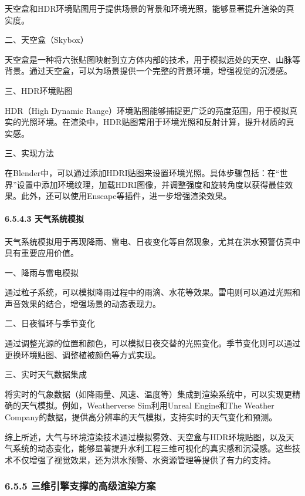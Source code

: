 天空盒和HDR环境贴图用于提供场景的背景和环境光照，能够显著提升渲染的真实度。

二、天空盒（Skybox）

天空盒是一种将六张贴图映射到立方体内部的技术，用于模拟远处的天空、山脉等背景。通过天空盒，可以为场景提供一个完整的背景环境，增强视觉的沉浸感。

三、HDR环境贴图

HDR（High Dynamic Range）环境贴图能够捕捉更广泛的亮度范围，用于模拟真实的光照环境。在渲染中，HDR贴图常用于环境光照和反射计算，提升材质的真实感。

三、实现方法

在Blender中，可以通过添加HDRI贴图来设置环境光照。具体步骤包括：在``世界''设置中添加环境纹理，加载HDRI图像，并调整强度和旋转角度以获得最佳效果。此外，还可以使用Enscape等插件，进一步增强渲染效果。

\paragraph{6.5.4.3 天气系统模拟}\label{ux5929ux6c14ux7cfbux7edfux6a21ux62df}

天气系统模拟用于再现降雨、雷电、日夜变化等自然现象，尤其在洪水预警仿真中具有重要应用价值。

一、降雨与雷电模拟

通过粒子系统，可以模拟降雨过程中的雨滴、水花等效果。雷电则可以通过光照和声音效果的结合，增强场景的动态表现力。

二、日夜循环与季节变化

通过调整光源的位置和颜色，可以模拟日夜交替的光照变化。季节变化则可以通过更换环境贴图、调整植被颜色等方式实现。

三、实时天气数据集成

将实时的气象数据（如降雨量、风速、温度等）集成到渲染系统中，可以实现更精确的天气模拟。例如，Weatherverse Sim利用Unreal Engine和The Weather Company的数据，提供高分辨率的天气模拟，支持实时的天气变化和预测。

综上所述，大气与环境渲染技术通过模拟雾效、天空盒与HDR环境贴图，以及天气系统的动态变化，能够显著提升水利工程三维可视化的真实感和沉浸感。这些技术不仅增强了视觉效果，还为洪水预警、水资源管理等提供了有力的支持。

\subsubsection{6.5.5 三维引擎支撑的高级渲染方案}\label{ux4e09ux7ef4ux5f15ux64ceux652fux6491ux7684ux9ad8ux7ea7ux6e32ux67d3ux65b9ux6848}

